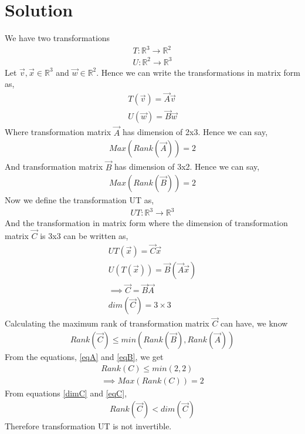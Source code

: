 \documentclass[journal,12pt,twocolumn]{IEEEtran}
\begin{document}
\section{Solution}
We have two transformations 
\begin{align}
T:\mathbb{R}^3\rightarrow\mathbb{R}^2\\
U:\mathbb{R}^2\rightarrow\mathbb{R}^3
\end{align}
Let $\vec{v},\vec{x}\in\mathbb{R}^3$ and $\vec{w}\in\mathbb{R}^2$. Hence we can write the transformations in matrix form as,
\begin{align}
T(\vec{v})=\vec{A}\vec{v} \label{Tmat}\\
U(\vec{w})=\vec{B}\vec{w} \label{Umat}
\end{align}
Where transformation matrix $\vec{A}$ has dimension of 2x3. Hence we can say,
\begin{align}\label{eqA}
Max(Rank(\vec{A}))=2
\end{align}
And transformation matrix $\vec{B}$ has dimension of 3x2. Hence we can say,
\begin{align}\label{eqB}
Max(Rank(\vec{B}))=2
\end{align}
Now we define the transformation UT as,
\begin{align}
UT:\mathbb{R}^3\rightarrow\mathbb{R}^3
\end{align}
And the transformation in matrix form where the dimension of transformation matrix $\vec{C}$ is 3x3 can be written as,
\begin{align}
UT(\vec{x})=\vec{C}\vec{x}\\
U(T(\vec{x}))=\vec{B}(\vec{A}\vec{x})\\
\implies \vec{C}=\vec{B}\vec{A} \label{MatC}\\
dim(\vec{C})=3\times3 \label{dimC}
\end{align}
Calculating the maximum rank of transformation matrix $\vec{C}$ can have, we know
\begin{align}
Rank(\vec{C})\le min(Rank(\vec{B}),Rank(\vec{A}))
\end{align}
From the equations, \eqref{eqA} and \eqref{eqB}, we get
\begin{align}
Rank(C)\le min(2,2)\\
\implies Max(Rank(C))=2 \label{eqC}
\end{align}
From equations \eqref{dimC} and \eqref{eqC},
\begin{align}
Rank(\vec{C})< dim(\vec{C})
\end{align}
Therefore transformation UT is not invertible.
\end{document}
